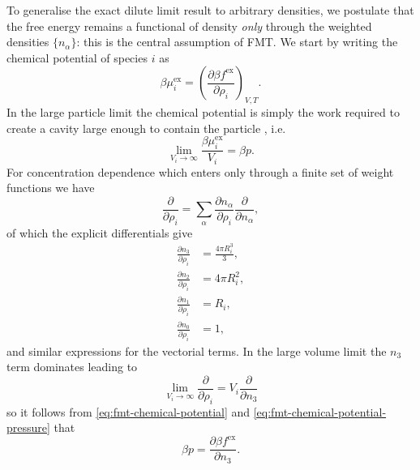 To generalise the exact dilute limit result to arbitrary densities, we postulate that the free energy remains a functional of density \emph{only} through the weighted densities $\{n_\alpha\}$: this is the central assumption of FMT.
We start by writing the chemical potential of species $i$ as
\begin{equation}\label{eq:fmt-chemical-potential}
  \beta \mu_i^\mathrm{ex}
  =
  \left(
  \frac{\partial \beta f^\mathrm{ex}}{\partial \rho_i}
  \right)_{V,T}.
\end{equation}
In the large particle limit the chemical potential is simply the work required to create a cavity large enough to contain the particle%
,
i.e.\ \cite{RothJPCM2002,ReissJCP1960}
\begin{equation}\label{eq:fmt-chemical-potential-pressure}
  \lim_{V_i \to \infty} \frac{\beta \mu_i^\mathrm{ex}}{V_i} = \beta p.
\end{equation}
For concentration dependence which enters only through a finite set of weight functions we have
\begin{equation*}
  \frac{\partial}{\partial \rho_i}
  =
  \sum_\alpha
  \frac{\partial n_\alpha}{\partial \rho_i}
  \frac{\partial}{\partial n_\alpha},
\end{equation*}
of which the explicit differentials give
\begin{subequations}\label{eq:fmt-n-derivatives}
  \begin{align}
    \frac{\partial n_3}{\partial \rho_i}
    &=
    \frac{4 \pi R_i^3}{3},
    \\
    \frac{\partial n_2}{\partial \rho_i}
    &=
    4 \pi R_i^2,
    \\
    \frac{\partial n_1}{\partial \rho_i}
    &=
    R_i,
    \\
    \frac{\partial n_0}{\partial \rho_i}
    &=
    1,
  \end{align}
\end{subequations}
and similar expressions for the vectorial terms.
In the large volume limit the $n_3$ term dominates leading to
\begin{equation*}
  \lim_{V_i \to \infty}
  \frac{\partial}{\partial \rho_i}
  =
  V_i \frac{\partial}{\partial n_3}
\end{equation*}
so it follows from \eqref{eq:fmt-chemical-potential} and \eqref{eq:fmt-chemical-potential-pressure} that
\begin{equation}\label{eq:fmt-pressure}
  \beta p
  =
  \frac{\partial \beta f^\mathrm{ex} }{\partial n_3}.
\end{equation}
